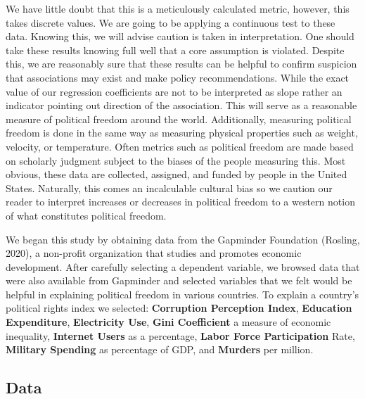 \documentclass[
  english,
  man,floatsintext]{apa6}
\begin{document}
We have little doubt that this is a meticulously calculated metric, however, this takes discrete values. We are going to be applying a continuous test to these data. Knowing this, we will advise caution is taken in interpretation. One should take these results knowing full well that a core assumption is violated. Despite this, we are reasonably sure that these results can be helpful to confirm suspicion that associations may exist and make policy recommendations. While the exact value of our regression coefficients are not to be interpreted as slope rather an indicator pointing out direction of the association. This will serve as a reasonable measure of political freedom around the world. Additionally, measuring political freedom is done in the same way as measuring physical properties such as weight, velocity, or temperature. Often metrics such as political freedom are made based on scholarly judgment subject to the biases of the people measuring this. Most obvious, these data are collected, assigned, and funded by people in the United States. Naturally, this comes an incalculable cultural bias so we caution our reader to interpret increases or decreases in political freedom to a western notion of what constitutes political freedom.

We began this study by obtaining data from the Gapminder Foundation (Rosling, 2020), a non-profit organization that studies and promotes economic development. After carefully selecting a dependent variable, we browsed data that were also available from Gapminder and selected variables that we felt would be helpful in explaining political freedom in various countries. To explain a country's political rights index we selected: \textbf{Corruption Perception Index}, \textbf{Education Expenditure}, \textbf{Electricity Use}, \textbf{Gini Coefficient} a measure of economic inequality, \textbf{Internet Users} as a percentage, \textbf{Labor Force Participation} Rate, \textbf{Military Spending} as percentage of GDP, and \textbf{Murders} per million.

\hypertarget{data}{%
\subsection{Data}\label{data}}
\end{document}
